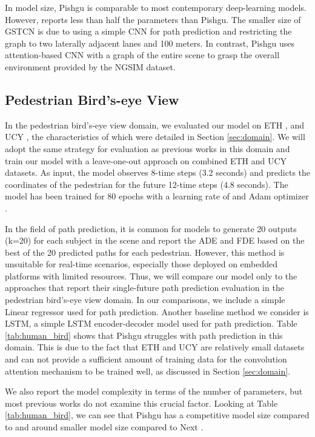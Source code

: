 \documentclass[sigconf]{acmart}
\begin{document}
In model size, Pishgu is comparable to most contemporary deep-learning models. However, \cite{GSTCN2022} reports less than half the parameters than Pishgu. The smaller size of GSTCN is due to using a simple CNN for path prediction and restricting the graph to two laterally adjacent lanes and 100 meters. In contrast, Pishgu uses attention-based CNN with a graph of the entire scene to grasp the overall environment provided by the NGSIM dataset.



\subsection{Pedestrian Bird's-eye View}


In the pedestrian bird's-eye view domain, we evaluated our model on ETH \cite{pellegrini2009you}, and UCY \cite{lerner2007crowds}, the characteristics of which were detailed in Section \ref{sec:domain}. We will adopt the same strategy for evaluation as previous works in this domain \cite{gupta2018social} and train our model with a leave-one-out approach on combined ETH and UCY datasets. As input, the model observes 8-time steps (3.2 seconds) and predicts the coordinates of the pedestrian for the future 12-time steps (4.8 seconds). The model has been trained for 80 epochs with a learning rate of  and Adam optimizer \cite{kingma2014adam}.

In the field of path prediction, it is common for models to generate 20 outputs (k=20) for each subject in the scene and report the ADE and FDE based on the best of the 20 predicted paths for each pedestrian. However, this method is unsuitable for real-time scenarios, especially those deployed on embedded platforms with limited resources. Thus, we will compare our model only to the approaches that report their single-future path prediction evaluation in the pedestrian bird's-eye view domain. In our comparisons, we include a simple Linear regressor used for path prediction. Another baseline method we consider is LSTM, a simple LSTM encoder-decoder model used for path prediction. Table \ref{tab:human_bird} shows that Pishgu struggles with path prediction in this domain. This is due to the fact that ETH\cite{pellegrini2009you} and UCY \cite{lerner2007crowds} are relatively small datasets and can not provide a sufficient amount of training data for the convolution attention mechanism to be trained well, as discussed in Section \ref{sec:domain}. 

We also report the model complexity in terms of the number of parameters, but most previous works do not examine this crucial factor. Looking at Table \ref{tab:human_bird}, we can see that Pishgu has a competitive model size compared to \cite{mendieta2021carpe} and around  smaller model size compared to Next \cite{liang2019peeking}.
\end{document}
